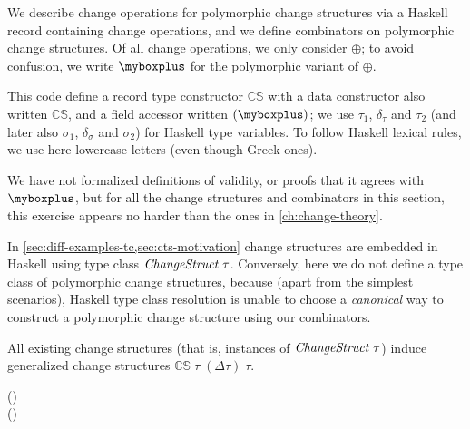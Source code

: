 We describe change operations for polymorphic change structures via a Haskell
record containing change operations, and we define combinators on polymorphic
change structures. Of all change operations, we only consider \ensuremath{\oplus }; to
avoid confusion, we write \ensuremath{\myboxplus} for the polymorphic variant of \ensuremath{\oplus }.
\resethooks
This code define a record type constructor \ensuremath{\mathbb{CS}} with a data constructor also
written \ensuremath{\mathbb{CS}}, and a field accessor written \ensuremath{(\myboxplus)}; we use \ensuremath{\tau_{1}}, \ensuremath{\delta_\tau} and
\ensuremath{\tau_{2}} (and later also \ensuremath{\sigma_{1}}, \ensuremath{\delta_\sigma} and \ensuremath{\sigma_{2}}) for
Haskell type variables. To follow Haskell lexical rules, we use here lowercase
letters (even though Greek ones).

We have not formalized definitions of validity, or proofs that it agrees with
\ensuremath{\myboxplus}, but for all the change structures and combinators in this section,
this exercise appears no harder than the ones in \cref{ch:change-theory}.

In \cref{sec:diff-examples-tc,sec:cts-motivation} change structures are embedded in Haskell
using type class \ensuremath{\Conid{ChangeStruct}\;\tau}. Conversely, here we do not define a type
class of polymorphic change
structures, because (apart from the simplest scenarios), Haskell type class
resolution is unable to choose a \emph{canonical} way to construct a polymorphic
change structure using our combinators.

All existing change structures (that is, instances of \ensuremath{\Conid{ChangeStruct}\;\tau}) induce
generalized change structures \ensuremath{\mathbb{CS}\;\tau\;(\Delta \tau)\;\tau}.
\begin{hscode}\SaveRestoreHook
{}%
%
\>[B]{}\mathrel{:\mkern-1mu:}\;\tau\Rightarrow{}\;\tau\;(\Delta \tau)\;\tau{}\<[E]%
\\
\>[B]{}\mathrel{=}\;(\oplus){}\<[E]%
\ColumnHook
\end{hscode}\resethooks

